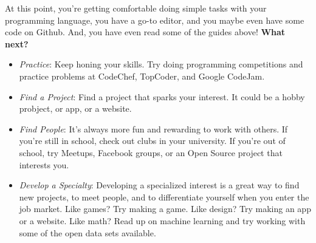 \documentclass{article}
\begin{document}
At this point, you're getting comfortable doing simple tasks with your
programming language, you have a go-to editor, and you maybe even have some
code on Github. And, you have even read some of the guides above! \textbf{What next?}

\begin{itemize}
  \item \textit{Practice}: Keep honing your skills. Try doing programming
  competitions and practice problems at CodeChef, TopCoder, and Google CodeJam.
  \item \textit{Find a Project}: Find a project that sparks your interest. It
  could be a hobby probject, or app, or a website.
  \item \textit{Find People}: It's always more fun and rewarding to work with
  others. If you're still in school, check out clubs in your university. If
  you're out of school, try Meetups, Facebook groups, or an Open Source project
  that interests you.
  \item \textit{Develop a Specialty}: Developing a specialized interest is a
  great way to find new projects, to meet people, and to differentiate yourself
  when you enter the job market. Like games? Try making a game. Like design?
  Try making an app or a website. Like math? Read up on machine learning and
  try working with some of the open data sets available.
\end{itemize}
\end{document}
